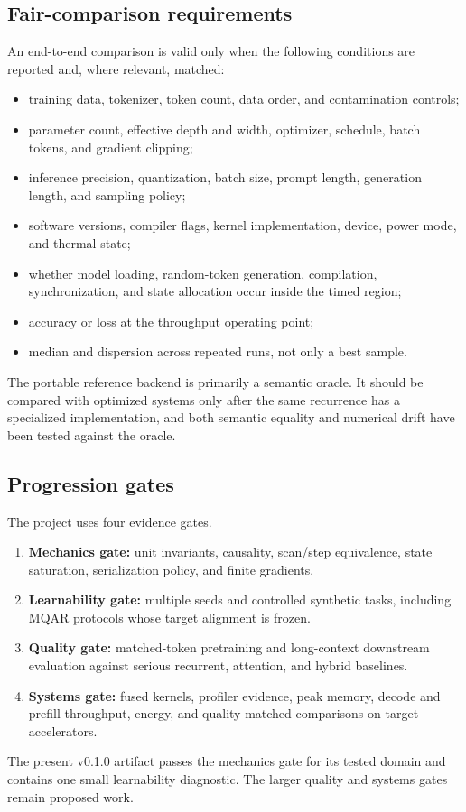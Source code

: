 \subsection{Fair-comparison requirements}
\label{sec:fair-comparison}

An end-to-end comparison is valid only when the following conditions are
reported and, where relevant, matched:

\begin{itemize}
  \item training data, tokenizer, token count, data order, and contamination
  controls;
  \item parameter count, effective depth and width, optimizer, schedule,
  batch tokens, and gradient clipping;
  \item inference precision, quantization, batch size, prompt length,
  generation length, and sampling policy;
  \item software versions, compiler flags, kernel implementation, device,
  power mode, and thermal state;
  \item whether model loading, random-token generation, compilation,
  synchronization, and state allocation occur inside the timed region;
  \item accuracy or loss at the throughput operating point;
  \item median and dispersion across repeated runs, not only a best sample.
\end{itemize}

The portable reference backend is primarily a semantic oracle. It should be
compared with optimized systems only after the same recurrence has a
specialized implementation, and both semantic equality and numerical drift
have been tested against the oracle.

\subsection{Progression gates}

The project uses four evidence gates.

\begin{enumerate}
  \item \textbf{Mechanics gate:} unit invariants, causality, scan/step
  equivalence, state saturation, serialization policy, and finite gradients.
  \item \textbf{Learnability gate:} multiple seeds and controlled synthetic
  tasks, including MQAR protocols whose target alignment is frozen.
  \item \textbf{Quality gate:} matched-token pretraining and long-context
  downstream evaluation against serious recurrent, attention, and hybrid
  baselines.
  \item \textbf{Systems gate:} fused kernels, profiler evidence, peak memory,
  decode and prefill throughput, energy, and quality-matched comparisons on
  target accelerators.
\end{enumerate}

The present v0.1.0 artifact passes the mechanics gate for its tested domain and
contains one small learnability diagnostic. The larger quality and systems
gates remain proposed work.
